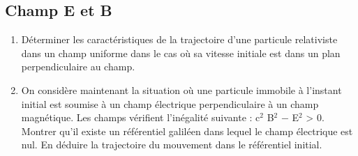 \subsection{Champ E et B}%
\begin{enumerate}
  \item Déterminer les caractéristiques de la trajectoire d’une particule relativiste dans un champ
 uniforme dans le cas où sa vitesse initiale est dans un plan perpendiculaire au champ.
  \item On considère maintenant la situation où une particule immobile à l’instant initial est
soumise à un champ électrique perpendiculaire à un champ magnétique. Les champs
vérifient l’inégalité suivante : c$^2$ B$^2$ − E$^2$ > 0. Montrer qu’il existe un référentiel galiléen
dans lequel le champ électrique est nul. En déduire la trajectoire du mouvement dans le
référentiel initial.
\end{enumerate}
